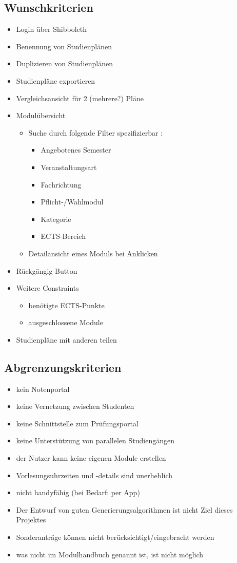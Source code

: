 \subsection{Wunschkriterien}
\label{subsec:project_goals-wunschkriterien}
\begin{itemize}[nosep]
	\item  Login über Shibboleth	
	\item Benennung von Studienplänen
	\item Duplizieren von Studienplänen
	\item Studienpläne exportieren
	\item Vergleichsansicht für 2 (mehrere?) Pläne 
	\item Modulübersicht
	\begin{itemize}[nosep]	
		\item Suche durch folgende Filter spezifizierbar : 
		\begin{itemize}[nosep]
			\item Angebotenes Semester
			\item Veranstaltungsart
			\item Fachrichtung
			\item Pflicht-/Wahlmodul
			\item Kategorie
			\item ECTS-Bereich
		\end{itemize}
		\item Detailansicht eines Moduls bei Anklicken
	\end{itemize}
	\item Rückgängig-Button
	\item Weitere Constraints
	\begin{itemize}[nosep]
		\item benötigte ECTS-Punkte
		\item ausgeschlossene Module
	\end{itemize}
	\item Studienpläne mit anderen teilen
\end{itemize}
\subsection{Abgrenzungskriterien}
\begin{itemize}[nosep]
	\item kein Notenportal
	\item keine Vernetzung zwischen Studenten
	\item keine Schnittstelle zum Prüfungsportal
	\item keine Unterstützung von parallelen Studiengängen
	\item der Nutzer kann keine eigenen Module erstellen
	\item Vorlesungsuhrzeiten und -details sind unerheblich
	\item nicht handyfähig (bei Bedarf: per App)
	\item Der Entwurf von guten Generierungsalgorithmen ist nicht Ziel dieses Projektes
	\item Sonderanträge können nicht berücksichtigt/eingebracht werden
	\item was nicht im Modulhandbuch genannt ist, ist nicht möglich
\end{itemize}